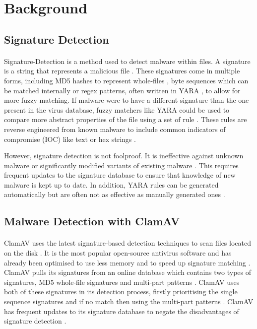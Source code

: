 \documentclass[12pt, conference, final, a4paper, onecolumn, compsoc]{IEEEtran}
\begin{document}
\section{Background}

\subsection{Signature Detection} %
\paragraph{}

Signature-Detection is a method used to detect malware within files. A signature
is a string that represents a malicious file \citep{intrusion-detect}. These
signatures come in multiple forms, including MD5 hashes to represent whole-files
\citep{sig-detection}, byte sequences which can be matched internally or regex
patterns, often written in YARA \citep{yara}, to allow for more fuzzy matching.
If malware were to have a different signature than the one present in the virus
database, fuzzy matchers like YARA could be used to compare more abstract
properties of the file using a set of rule \citep{yara}. These rules are reverse
engineered from known malware to include common indicators of compromise (IOC)
like text or hex strings \citep{yara-rules}.

However, signature detection is not foolproof. It is ineffective against unknown
malware or significantly modified variants of existing malware
\citep{intrusion-detect}. This requires frequent updates to the signature
database to ensure that knowledge of new malware is kept up to date. In
addition, YARA rules can be generated automatically but are often not as
effective as manually generated ones \citep{yara}.

\subsection{Malware Detection with ClamAV}
\paragraph{}

ClamAV uses the latest signature-based detection techniques to scan files
located on the disk \citep{splitscreen}. It is the most popular open-source
antivirus software and has already been optimised to use less memory and to
speed up signature matching \citep{splitscreen}. ClamAV pulls its signatures
from an online database which contains two types of signatures, MD5 whole-file
signatures and multi-part patterns \citep{string-matching}. ClamAV uses both of
these signatures in its detection process, firstly prioritising the single
sequence signatures and if no match then using the multi-part patterns
\citep{string-matching}. ClamAV has frequent updates to its signature database
to negate the disadvantages of signature detection \citep{clamav}.
\end{document}

